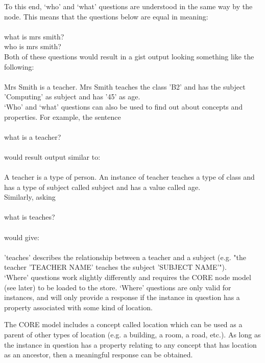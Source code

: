 \documentclass{scrartcl}
\newcommand{\ce}[1]{\textsf{#1}}
\begin{document}
To this end, `who' and `what' questions are understood in the same way by the node. This means that the questions below are equal in meaning:\\
\\\ce{what is mrs smith?}\\
\ce{who is mrs smith?}\\

Both of these questions would result in a gist output looking something like the following:\\
\\\ce{Mrs Smith is a teacher. Mrs Smith teaches the class 'B2' and has the subject 'Computing' as subject and has '45' as age.}\\

`Who' and `what' questions can also be used to find out about concepts and properties. For example, the sentence\\
\\\ce{what is a teacher?}\\
\\would result output similar to:\\
\\\ce{A teacher is a type of person. An instance of teacher teaches a type of class and has a type of subject called subject and has a value called age.}\\

Similarly, asking\\
\\\ce{what is teaches?}\\
\\would give:\\
\\\ce{'teaches' describes the relationship between a teacher and a subject (e.g. "the teacher 'TEACHER NAME' teaches the subject 'SUBJECT NAME'").}\\

`Where' questions work slightly differently and requires the CORE node model (see later) to be loaded to the store. `Where' questions are only valid for instances, and will only provide a response if the instance in question has a property associated with some kind of location.

The CORE model includes a concept called \ce{location} which can be used as a parent of other types of location (e.g. a building, a room, a road, etc.). As long as the instance in question has a property relating to any concept that has \ce{location} as an ancestor, then a meaningful response can be obtained.\\
\end{document}

